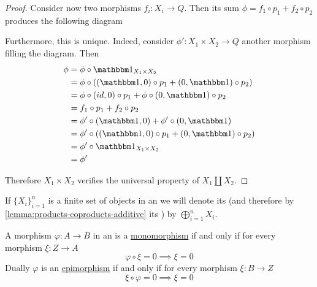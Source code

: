 \documentclass[../main.tex]{subfiles}
\begin{document}
\begin{proof}
  Consider now two morphisms \(f_{i}: X_{i} \to Q\).
  Then its sum \(\phi = f_{1} \circ p_{1} + f_{2} \circ p_{2}\) produces the following diagram
  \begin{center}
  \end{center}
  Furthermore, this is unique.
  Indeed, consider \(\phi': X_{1} \times X_{2} \to Q\) another morphism filling the diagram. Then
  \begin{align*}
    \phi &= \phi \circ \id_{X_{1} \times X_{2}} \\
      &= \phi \circ ( (\id, 0) \circ p_{1} + (0, \id) \circ p_{2} ) \\
      &= \phi \circ (id, 0) \circ p_{1} + \phi \circ (0, \id) \circ p_{2} \\
      &= f_{1} \circ p_{1} + f_{2} \circ p_{2} \\
      &= \phi' \circ (\id, 0) + \phi' \circ (0, \id) \\
      &= \phi' \circ ( (\id, 0) \circ p_{1} + (0, \id) \circ p_{2} ) \\
      &= \phi' \circ \id_{X_{1} \times X_{2}} \\
      &= \phi'
  \end{align*}

  Therefore \(X_{1} \times X_{2}\) verifies the universal property of \(X_{1} \amalg X_{2}\).
\end{proof}

\begin{notation}
  If \(\{X_{i}\}_{i=1}^{n}\) is a finite set of objects in an  we will denote its  (and therefore by \autoref{lemma:products-coproducts-additive} its ) by \(\bigoplus_{i=1}^{n} X_{i}\).
\end{notation}

\begin{lemma} \label{lemma:mono-epi-additive}
  A morphism \(\varphi: A \to B\) in an  is a \hyperref[def:mono-epi-morphism]{monomorphism} if and only if for every morphism \(\xi: Z \to A\)
  \begin{equation*}
    \varphi \circ \xi = 0 \implies \xi = 0
  \end{equation*}
  Dually \(\varphi\) is an \hyperref[def:mono-epi-morphism]{epimorphism} if and only if for every morphism \(\xi: B \to Z\)
  \begin{equation*}
    \xi \circ \varphi = 0 \implies \xi = 0
  \end{equation*}
\end{lemma}
\end{document}
